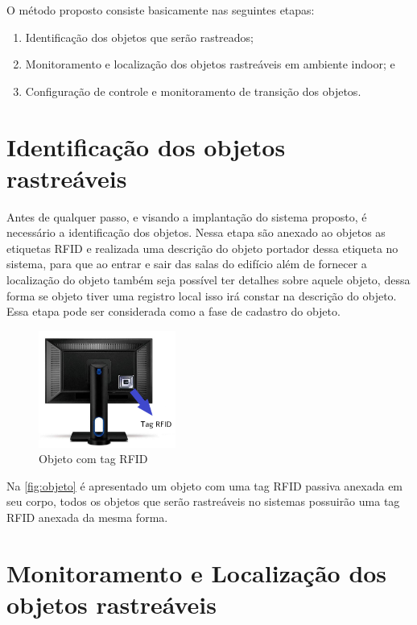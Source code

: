 \par
O método proposto consiste basicamente nas seguintes etapas:
\begin{enumerate}
    \item Identificação dos objetos que serão rastreados;
    \item Monitoramento e localização dos objetos rastreáveis em ambiente indoor; e
    \item Configuração de controle e monitoramento de transição dos objetos.
\end{enumerate}

%
%
\section{Identificação dos objetos rastreáveis}

Antes de qualquer passo, e visando a implantação do sistema proposto, é necessário a identificação dos objetos.
Nessa etapa são anexado ao objetos as etiquetas RFID e realizada uma descrição do objeto portador dessa etiqueta
no sistema, para que ao entrar e sair das salas do edifício além de fornecer a localização do objeto também seja
possível ter detalhes sobre aquele objeto, dessa forma se objeto tiver uma registro local isso irá constar na
descrição do objeto. Essa etapa pode ser considerada como a fase de cadastro do objeto.

\begin{figure}[H]
              \caption{\label{fig:objeto}{Objeto com tag RFID}}
              \centering
              \includegraphics[width=0.4\textwidth]{Figuras/monitor.png}
\end{figure}
\par
Na \autoref{fig:objeto} é apresentado um objeto com uma tag RFID passiva anexada em seu corpo, todos os objetos que serão rastreáveis no sistemas possuirão uma tag RFID anexada da mesma forma.

%
\section{Monitoramento e Localização dos objetos rastreáveis}

